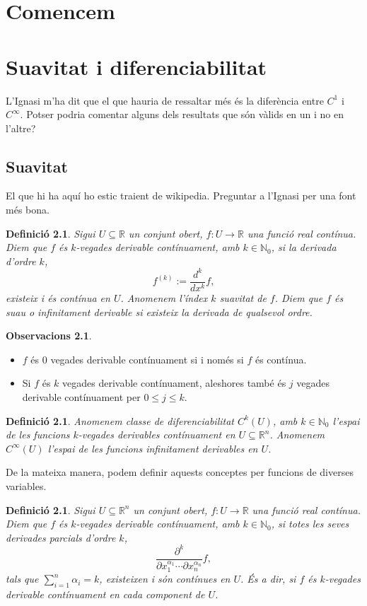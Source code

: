 \documentclass[11pt,a4paper,openright,oneside]{book}
\numberwithin{equation}{section}
\newtheorem{defi}[teo]{Definici\'o}
\theoremstyle{definition}
\newtheorem{obss}[teo]{Observacions}
\begin{document}
\newpage

\setcounter{page}{1}

\chapter{Comencem}


\newpage

\chapter{Suavitat i diferenciabilitat}
{\color{blue} L'Ignasi m'ha dit que el que hauria de ressaltar més és la diferència entre $C^1$ i $C^\infty$. Potser podria comentar alguns dels resultats que són vàlids en un i no en l'altre?}
\section{Suavitat}
{\color{blue} El que hi ha aquí ho estic traient de wikipedia. Preguntar a l'Ignasi per una font més bona.}
\begin{defi}
    Sigui $U\subseteq\mathbb R$ un conjunt obert, $f:U\to\mathbb R$ una funció real contínua.
    Diem que $f$ és {\normalfont $k$-vegades derivable contínuament}, amb $k\in\mathbb N_0$, si la derivada d'ordre $k$, $$f^{(k)}:= \frac{d^k}{dx^k}f,$$ existeix i és contínua en $U$. Anomenem l'índex $k$ \textit{suavitat} de $f$.
    Diem que $f$ és {\normalfont suau} o {\normalfont infinitament derivable} si existeix la derivada de qualsevol ordre.
\end{defi}
\begin{obss}
\end{obss}
\begin{itemize}
    \item $f$ és $0$ vegades derivable contínuament si i només si $f$ és contínua. 
    \item Si $f$ és $k$ vegades derivable contínuament, aleshores també és $j$ vegades derivable contínuament per $0\le j\le k$.
\end{itemize}
\begin{defi}
    Anomenem \textit{classe de diferenciabilitat} $C^k(U)$, amb $k\in\mathbb N_0$ l'espai de les funcions $k$-vegades derivables contínuament en $U\subseteq\mathbb R^n$. Anomenem $C^\infty(U)$ l'espai de les funcions infinitament derivables en $U$.
\end{defi}
De la mateixa manera, podem definir aquests conceptes per funcions de diverses variables.
\begin{defi}
    Sigui $U\subseteq\mathbb R^n$ un conjunt obert, $f:U\to\mathbb R$ una funció real contínua.
    Diem que $f$ és \textit{$k$-vegades derivable contínuament}, amb $k\in\mathbb N_0$, si totes les seves derivades parcials d'ordre $k$, $$\frac{\partial^k}{\partial x_1^{\alpha_1}\cdots\partial x_n^{\alpha_n}}f,$$ tals que $\sum_{i=1}^n\alpha_i = k$, existeixen i són contínues en $U$. És a dir, si $f$ és $k$-vegades derivable contínuament en cada component de $U$.
\end{defi}
\end{document}

